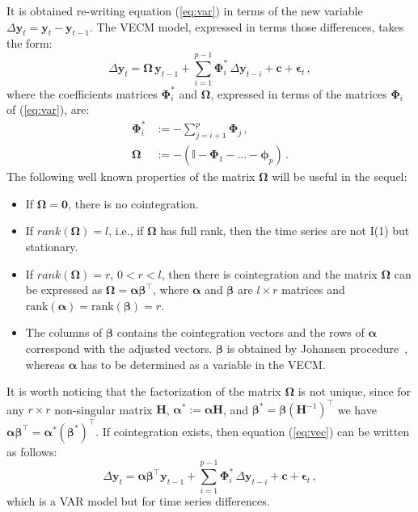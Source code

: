 \documentclass[twocolumn]{svjour3}          %
\begin{document}
It is obtained re-writing equation (\ref{eq:var}) in terms of the new
variable $\Delta\mathbf{y}_t=\mathbf{y}_t-\mathbf{y}_{t-1}$.
The VECM model, expressed in terms those differences, takes the form:
\begin{equation}\label{eq:vec}
\Delta \mathbf{y}_t 
= \boldsymbol{\Omega}\,\mathbf{y}_{t-1}
  + \sum_{i=1}^{p-1} \boldsymbol{\Phi}_i^*\,\Delta\mathbf{y}_{t-i}
  + \mathbf{c} + \boldsymbol{\epsilon}_t\,,
\end{equation}
\noindent
where the coefficients matrices $\boldsymbol{\Phi}_i^*$ and 
$\boldsymbol{\Omega}$, expressed in terms of the matrices
$\boldsymbol{\Phi}_i$ of (\ref{eq:var}), are:
\begin{align*}
\boldsymbol{\Phi}_i^* 
&:= -\sum_{j=i+1}^{p}\boldsymbol{\Phi}_j\,, \\
\boldsymbol{\Omega}
&:= -\left( \mathbb{I} - \boldsymbol{\Phi}_1 - \dots 
    - \boldsymbol{\phi}_p \right)\,. 
\end{align*}
The following well known properties of the matrix $\boldsymbol{\Omega}$
\cite{johansen1995} will be useful in the sequel:
\begin{itemize}
\item
If $\boldsymbol{\Omega} = \mathbf{0}$, there is no cointegration.
\item 
If $rank(\boldsymbol{\Omega})=l$, i.e., if $\boldsymbol{\Omega}$ has
full rank, then the time series are not I(1) but stationary.
\item
If $rank(\boldsymbol{\Omega})=r$, $0<r<l$, then there is cointegration
and the matrix $\boldsymbol{\Omega}$ can be expressed as
$\boldsymbol{\Omega}=\boldsymbol{\alpha\beta}^\top$, where $\boldsymbol{\alpha}$
and $\boldsymbol{\beta}$ are
$l\times r$ matrices and
$\text{rank}(\boldsymbol{\alpha})=\text{rank}(\boldsymbol{\beta})=r$.
\item
The columns of $\boldsymbol{\beta}$ contains the cointegration vectors and the rows of
$\boldsymbol{\alpha}$ correspond with the adjusted vectors. 
$\boldsymbol{\beta}$ is obtained by Johansen procedure~\cite{johansen1988},
whereas $\boldsymbol{\alpha}$ has to be determined as a variable in the VECM.
\end{itemize}
It is worth noticing that the factorization of the matrix
$\boldsymbol\Omega$ is not unique, since for any $r \times r$
non-singular matrix $\mathbf{H}$, $\boldsymbol{\alpha}^*:=\boldsymbol{\alpha}\mathbf{H}$,
and $\boldsymbol{\beta}^*=\boldsymbol{\beta}(\mathbf{H}^{-1})^\top$ we have
$\boldsymbol{\alpha\beta}^\top=\boldsymbol{\alpha}^*(\boldsymbol{\beta}^*)^\top$.
If cointegration exists, then equation (\ref{eq:vec}) can be written
as follows:
\begin{equation}\label{eq:vecfull}
\Delta\mathbf{y}_t 
= \boldsymbol{\alpha\beta}^\top\mathbf{y}_{t-1} 
  + \sum_{i=1}^{p-1}\boldsymbol{\Phi}_i^*\,\Delta\mathbf{y}_{t-i}
  + \mathbf{c} + \boldsymbol{\epsilon}_t\,,
\end{equation}
\noindent
which is a VAR model but for time series differences.
\end{document}
